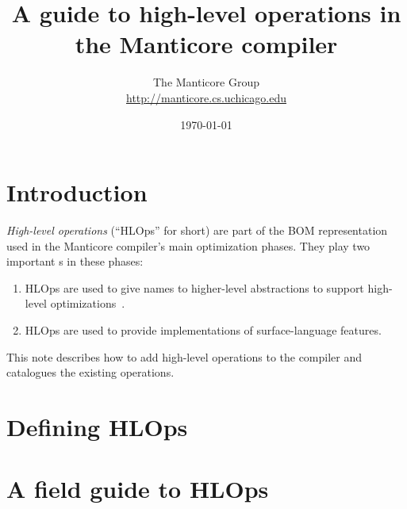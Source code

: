 \documentclass[11pt]{article}
\title{A guide to high-level operations in the Manticore compiler}
\author{The Manticore Group \\
  {\small{}\url{http://manticore.cs.uchicago.edu}}}
\date{\today}
\begin{document}
\maketitle

\section{Introduction}
\emph{High-level operations} (``HLOps'' for short) are part of the BOM representation used
in the Manticore compiler's main optimization phases.
They play two important \role{}s in these phases:
\begin{enumerate}
  \item HLOps are used to give names to higher-level abstractions to support high-level
    optimizations~\cite{playing-by-the-rules,optimizing-cml}.
  \item HLOps are used to provide implementations of surface-language features.
\end{enumerate}%
This note describes how to add high-level operations to the compiler and
catalogues the existing operations.

\section{Defining HLOps}

\section{A field guide to HLOps}
\end{document}
